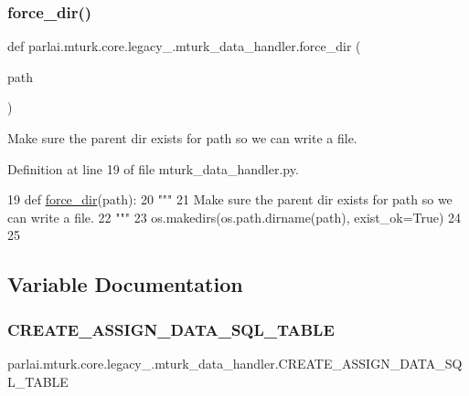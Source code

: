 \subsubsection{\texorpdfstring{force\+\_\+dir()}{force\_dir()}}
{\footnotesize\ttfamily def parlai.\+mturk.\+core.\+legacy\+\_.\+mturk\+\_\+data\+\_\+handler.\+force\+\_\+dir (\begin{DoxyParamCaption}\item[{}]{path }\end{DoxyParamCaption})}

\begin{DoxyVerb}Make sure the parent dir exists for path so we can write a file.
\end{DoxyVerb}
 

Definition at line 19 of file mturk\+\_\+data\+\_\+handler.\+py.


\begin{DoxyCode}
19 \textcolor{keyword}{def }\hyperlink{namespaceparlai_1_1mturk_1_1core_1_1mturk__data__handler_a28ec50366a486cded72d95c9be461c2f}{force\_dir}(path):
20     \textcolor{stringliteral}{"""}
21 \textcolor{stringliteral}{    Make sure the parent dir exists for path so we can write a file.}
22 \textcolor{stringliteral}{    """}
23     os.makedirs(os.path.dirname(path), exist\_ok=\textcolor{keyword}{True})
24 
25 
\end{DoxyCode}


\subsection{Variable Documentation}
\mbox{\label{namespaceparlai_1_1mturk_1_1core_1_1legacy__2018_1_1mturk__data__handler_ae43b1f00105d6c82996463c7d71c2499}} 
\subsubsection{\texorpdfstring{C\+R\+E\+A\+T\+E\+\_\+\+A\+S\+S\+I\+G\+N\+\_\+\+D\+A\+T\+A\+\_\+\+S\+Q\+L\+\_\+\+T\+A\+B\+LE}{CREATE\_ASSIGN\_DATA\_SQL\_TABLE}}
{\footnotesize\ttfamily parlai.\+mturk.\+core.\+legacy\+\_.\+mturk\+\_\+data\+\_\+handler.\+C\+R\+E\+A\+T\+E\+\_\+\+A\+S\+S\+I\+G\+N\+\_\+\+D\+A\+T\+A\+\_\+\+S\+Q\+L\+\_\+\+T\+A\+B\+LE}



